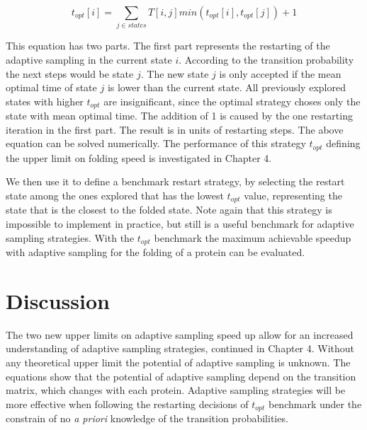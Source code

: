 $$t_{opt}[i]=\sum_{j \in states}T[i,j]min(t_{opt}[i],t_{opt}[j])+1$$

This equation has two parts. The first part represents the restarting of the adaptive sampling in the current state $i$. According to the transition probability the next steps would be state $j$. The new state $j$ is only accepted if the mean optimal time of state $j$ is lower than the current state. All previously explored states with higher $t_{opt}$ are insignificant, since the optimal strategy choses only the state with mean optimal time. The addition of 1 is caused by the one restarting iteration in the first part. The result is in units of restarting steps. The above equation can be solved numerically. The performance of this strategy $t_{opt}$ defining the upper limit on folding speed is investigated in Chapter 4.

We then use it to define a benchmark restart strategy, by
selecting the restart state among the ones explored that has the lowest
$t_{opt}$ value, representing the state that is the closest to the folded
state. Note again that this strategy is impossible to implement in
practice, but still is a useful benchmark for adaptive sampling strategies.
With the $t_{opt}$ benchmark the maximum achievable speedup with adaptive
sampling for the folding of a protein can be evaluated.


\section{\label{sec:methods}Discussion}

The two new upper limits on adaptive sampling speed up allow for an increased understanding of adaptive sampling strategies, continued in Chapter 4. Without any theoretical upper limit the potential of adaptive sampling is unknown. The equations show that the potential of adaptive sampling depend on the transition matrix, which changes with each protein. Adaptive sampling strategies will be more effective when following the restarting decisions of $t_{opt}$ benchmark under the constrain of no \emph{a priori} knowledge of the transition probabilities.



















